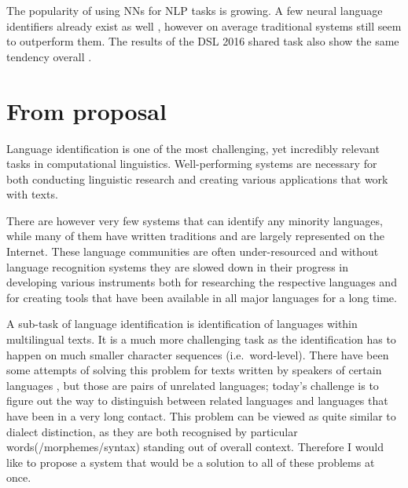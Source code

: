 The popularity of using NNs for NLP tasks is growing. A few neural language identifiers already exist as well \parencite[among others]{tian2003scalable,takcci2012minimal,simoes2014language}, however on average traditional systems still seem to outperform them. The results of the DSL 2016 shared task also show the same tendency overall \parencite{bjerva:2016:VarDial3,cianflone-kosseim:2016:VarDial3,ccoltekin-rama:2016:VarDial3,dsl2016}.%


\section{From proposal}

Language identification is one of the most challenging, yet incredibly relevant tasks in computational linguistics. Well-performing systems are necessary for both conducting linguistic research and creating various applications that work with texts.

There are however very few systems that can identify any minority languages, while many of them have written traditions and are largely represented on the Internet. These language communities are often under-resourced and without language recognition systems they are slowed down in their progress in developing various instruments both for researching the respective languages and for creating tools that have been available in all major languages for a long time.

A sub-task of language identification is identification of languages within multilingual texts. It is a much more challenging task as the identification has to happen on much smaller character sequences (i.e.\ word-level). There have been some attempts of solving this problem for texts written by speakers of certain languages \parencite{nguyen2013word,maharjan2015developing}, but those are pairs of unrelated languages; today's challenge is to figure out the way to distinguish between related languages and languages that have been in a very long contact. This problem can be viewed as quite similar to dialect distinction, as they are both recognised by particular words(/morphemes/syntax) standing out of overall context. Therefore I would like to propose a system that would be a solution to all of these problems at once.


